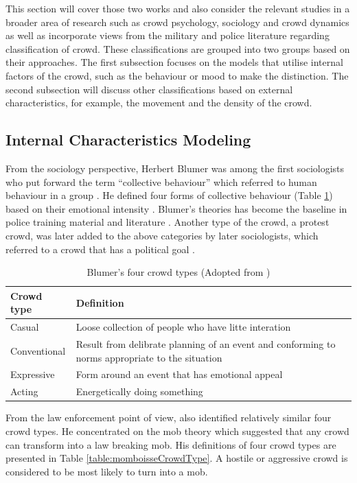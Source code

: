 This section will cover those two works and also consider the relevant studies in a broader area of research such as crowd psychology, sociology and crowd dynamics as well as incorporate views from the military and police literature regarding classification of crowd. These classifications are grouped into two groups based on their approaches. The first subsection focuses on the models that utilise internal factors of the crowd, such as the behaviour or mood to make the distinction. The second subsection will discuss other classifications based on external characteristics, for example, the movement and the density of the crowd.

\subsection{Internal Characteristics Modeling}

From the sociology perspective, Herbert Blumer was among the first sociologists who put forward the term ``collective behaviour'' which referred to human behaviour in a group \citep{Blumer1951}. He defined four forms of collective behaviour (Table \ref{table:blumerCrowdType}) based on their emotional intensity \citep{Imhonopi2013}. Blumer’s theories has become the baseline in police training material and literature \citep{Schweingruber2000}. Another type of the crowd, a protest crowd, was later added to the above categories by later sociologists, which referred to a crowd that has a political goal \citep{Imhonopi2013}.

\begin{table}[!htbp]
	\caption{Blumer's four crowd types (Adopted from \citet{Imhonopi2013})}
	\label{table:blumerCrowdType}
	\centering
	\begin{tabular}{|l|p{10cm}|}
		\hline
		\textbf{Crowd type} & \textbf{Definition} \\ \hline \hline
		Casual & Loose collection of people who have litte interation \\ \hline
		Conventional & Result from delibrate planning of an event and conforming to norms appropriate to the situation \\ \hline
		Expressive & Form around an event that has emotional appeal \\ \hline
		Acting & Energetically doing something \\ \hline
	\end{tabular}
\end{table}

From the law enforcement point of view, \citet{Momboisse1967} also identified relatively similar four crowd types. He concentrated on the mob theory which suggested that any crowd can transform into a law breaking mob. His definitions of four crowd types are presented in Table \ref{table:momboisseCrowdType}. A hostile or aggressive crowd is considered to be most likely to turn into a mob.

